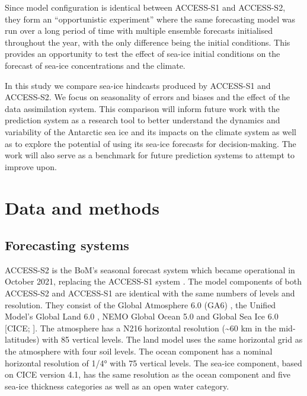\documentclass[tc, manuscript]{copernicus}
\begin{document}
Since model configuration is identical between ACCESS-S1 and ACCESS-S2,
they form an ``opportunistic experiment'' where the same forecasting
model was run over a long period of time with multiple ensemble
forecasts initialised throughout the year, with the only difference
being the initial conditions. This provides an opportunity to test the
effect of sea-ice initial conditions on the forecast of sea-ice
concentrations and the climate.

In this study we compare sea-ice hindcasts produced by ACCESS-S1 and
ACCESS-S2. We focus on seasonality of errors and biases and the effect
of the data assimilation system. This comparison will inform future work
with the prediction system as a research tool to better understand the
dynamics and variability of the Antarctic sea ice and its impacts on the
climate system as well as to explore the potential of using its sea-ice
forecasts for decision-making. The work will also serve as a benchmark
for future prediction systems to attempt to improve upon.

\section{Data and methods}\label{data-and-methods}

\subsection{Forecasting systems}\label{sec-systems}

ACCESS-S2 \citep{wedd2022} is the BoM's seasonal forecast system which
became operational in October 2021, replacing the ACCESS-S1 system
\citep{hudson2017}. The model components of both ACCESS-S2 and ACCESS-S1
are identical with the same numbers of levels and resolution. They
consist of the Global Atmosphere 6.0 (GA6)
\citep{williams2015, waters2017}, the Unified Model's Global Land 6.0
\citep{best2011, waters2017}, NEMO Global Ocean 5.0
\citep{gurvan2013, megann2014} and Global Sea Ice 6.0 {[}CICE;
\citet{cice}{]}. The atmosphere has a N216 horizontal resolution
(\textasciitilde60 km in the mid-latitudes) with 85 vertical levels. The
land model uses the same horizontal grid as the atmosphere with four
soil levels. The ocean component has a nominal horizontal resolution of
1/4° with 75 vertical levels. The sea-ice component, based on CICE
version 4.1, has the same resolution as the ocean component and five
sea-ice thickness categories as well as an open water category.
\end{document}
